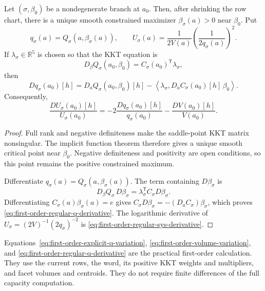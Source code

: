 \begin{proposition}
\label{prop:first-order-regular-branch}
Let \((\sigma,\beta_0)\) be a nondegenerate branch at \(a_0\).  Then, after
shrinking the row chart, there is a unique smooth constrained maximizer
\(\beta_\sigma(a)>0\) near \(\beta_0\).  Put
\[
  q_\sigma(a)=Q_\sigma(a,\beta_\sigma(a)),
  \qquad
  U_\sigma(a)=
  \frac{1}{2V(a)}\left(\frac{1}{2q_\sigma(a)}\right)^2.
\]
If \(\lambda_\sigma\in\mathbb R^5\) is chosen so that the KKT equation is
\[
  D_\beta Q_\sigma(a_0,\beta_0)
  =C_\sigma(a_0)^{\mathsf T}\lambda_\sigma,
\]
then
\begin{equation}\label{eq:first-order-regular-q-derivative}
  Dq_\sigma(a_0)[h]
  =D_aQ_\sigma(a_0,\beta_0)[h]
   -\left\langle
      \lambda_\sigma,
      D_aC_\sigma(a_0)[h]\,\beta_0
    \right\rangle.
\end{equation}
Consequently,
\begin{equation}\label{eq:first-order-regular-sys-derivative}
  \frac{DU_\sigma(a_0)[h]}{U_\sigma(a_0)}
  =-2\frac{Dq_\sigma(a_0)[h]}{q_\sigma(a_0)}
   -\frac{DV(a_0)[h]}{V(a_0)}.
\end{equation}
\end{proposition}

\begin{proof}
Full rank and negative definiteness make the saddle-point KKT matrix
nonsingular.  The implicit function theorem therefore gives a unique smooth
critical point near \(\beta_0\).  Negative definiteness and positivity are
open conditions, so this point remains the positive constrained maximum.

Differentiate
\(q_\sigma(a)=Q_\sigma(a,\beta_\sigma(a))\).  The term containing
\(D\beta_\sigma\) is
\[
  D_\beta Q_\sigma\,D\beta_\sigma
  =\lambda_\sigma^{\mathsf T}
    C_\sigma D\beta_\sigma.
\]
Differentiating
\(C_\sigma(a)\beta_\sigma(a)=e\) gives
\(C_\sigma D\beta_\sigma=-(D_aC_\sigma)\beta_\sigma\), which proves
\eqref{eq:first-order-regular-q-derivative}.  The logarithmic derivative of
\(U_\sigma=(2V)^{-1}(2q_\sigma)^{-2}\) is
\eqref{eq:first-order-regular-sys-derivative}.
\end{proof}

Equations~\eqref{eq:first-order-explicit-q-variation},
\eqref{eq:first-order-volume-variation}, and
\eqref{eq:first-order-regular-q-derivative} are the practical first-order
calculation.  They use the current rows, the word, its positive KKT weights and
multipliers, and facet volumes and centroids.  They do not require finite
differences of the full capacity computation.

